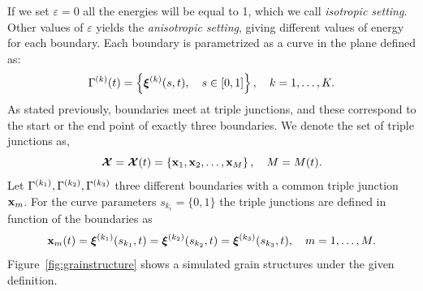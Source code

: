 If we set $\varepsilon = 0$ all the energies will be equal to 1, which we call \emph{isotropic setting}. 
Other values of $\varepsilon$ yields the \emph{anisotropic setting}, giving different values of energy for each boundary.
%
Each boundary is parametrized as a curve in the plane defined as:
\begin{equation}
    \Gamma^{(k)}(t) = \left\{ \bm{\xi}^{(k)}(s,t), \quad s \in [0, 1] \right\},\quad k = 1, \dotsc, K.
    \label{eq:grainboundary}
\end{equation}
As stated previously, boundaries meet at triple junctions, and these correspond to the start or the end point of exactly three boundaries. 
We denote the set of triple junctions as,
\begin{equation}
    \vertices = \vertices(t) = \left\{ \x_1, \x_2, \dotsc, \x_M \right\},\quad M = M(t).
\end{equation}
Let $\Gamma^{(k_1)}, \Gamma^{(k_2)}, \Gamma^{(k_3)}$ three different boundaries with a common triple junction $\x_m$. For the curve parameters $s_{k_i} = \{0,1\}$ the triple junctions are defined in function of the boundaries as
\begin{equation*}
    \x_{m}(t) =  \vxi^{(k_1)} (s_{k_1},t) = \vxi^{(k_2)} (s_{k_2},t) = \vxi^{(k_3)} (s_{k_3},t),\quad m =1,\dotsc,M.
\end{equation*}
%
Figure~\ref{fig:grainstructure} shows a simulated grain structures under the given definition.
